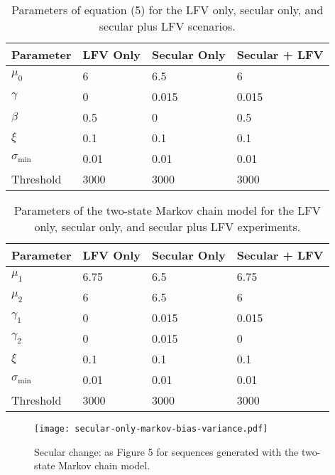 \documentclass[
      draft,
      ef,
]{agutexSI2019}
\begin{document}
    \begin{table}[ht]
      \centering
      \begin{tabular}{llll}
        \toprule
        Parameter & LFV Only & Secular Only & Secular + LFV \\
        \midrule
        $\mu_0$             & 6     & 6.5   & 6 \\
        $\gamma$            & 0     & 0.015 & 0.015\\
        $\beta$             & 0.5   & 0     & 0.5\\
        $\xi$               & 0.1   & 0.1   & 0.1\\
        $\sigma_\text{min}$ & 0.01  & 0.01  & 0.01\\
        Threshold           & 3000  & 3000  & 3000 \\
        \bottomrule
      \end{tabular}
      \caption{
        Parameters of equation (5) for the LFV only, secular only, and secular plus LFV scenarios.
      }\label{tab:nino-stationary}
    \end{table}

    \begin{table}[ht]
      \centering
      \begin{tabular}{llll}
        \toprule
        Parameter & LFV Only & Secular Only & Secular + LFV \\
        \midrule
        $\mu_1$             & 6.75  & 6.5   & 6.75\\
        $\mu_2$             & 6     & 6.5   & 6\\
        $\gamma_1$          & 0     & 0.015 & 0.015\\
        $\gamma_2$          & 0     & 0.015 & 0\\
        $\xi$               & 0.1   & 0.1   & 0.1\\
        $\sigma_\text{min}$ & 0.01  & 0.01  & 0.01\\
        Threshold           & 3000  & 3000  & 3000 \\
        \bottomrule
      \end{tabular}
      \caption{
        Parameters of the two-state Markov chain model for the LFV only, secular only, and secular plus LFV experiments.
      }\label{tab:markov-stationary}
    \end{table}
    
    \begin{figure}
      \centering
      \texttt{[image: secular-only-markov-bias-variance.pdf]}
      \caption{
        Secular change: as Figure 5 for sequences generated with the two-state Markov chain model.
      }\label{fig:secular-only-markov-bias-variance}
    \end{figure}
\end{document}
